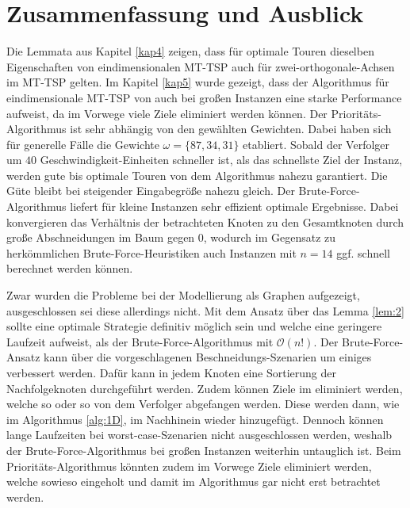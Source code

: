 \documentclass[german,version-2019-11]{uzl-thesis}
\begin{document}
\chapter{Zusammenfassung und Ausblick}
Die Lemmata aus Kapitel \ref{kap4} zeigen, dass für optimale Touren dieselben Eigenschaften von eindimensionalen MT-TSP auch für zwei-orthogonale-Achsen im MT-TSP gelten. Im Kapitel \ref{kap5} wurde gezeigt, dass der Algorithmus für eindimensionale MT-TSP von \cite{helvig} auch bei großen Instanzen eine starke Performance aufweist, da im Vorwege viele Ziele eliminiert werden können. 
Der Prioritäts-Algorithmus ist sehr abhängig von den gewählten Gewichten. Dabei haben sich für generelle Fälle die Gewichte $\omega=\{87,34,31\}$ etabliert. Sobald der Verfolger um $40$ Geschwindigkeit-Einheiten schneller ist, als das schnellste Ziel der Instanz, werden gute bis optimale Touren von dem Algorithmus nahezu garantiert. Die Güte bleibt bei steigender Eingabegröße nahezu gleich. Der Brute-Force-Algorithmus liefert für kleine Instanzen sehr effizient optimale Ergebnisse. Dabei konvergieren das Verhältnis der betrachteten Knoten zu den Gesamtknoten durch große Abschneidungen im Baum gegen $0$, wodurch im Gegensatz zu herkömmlichen Brute-Force-Heuristiken auch Instanzen mit $n=14$ ggf. schnell berechnet werden können. 

Zwar wurden die Probleme bei der Modellierung als Graphen aufgezeigt, ausgeschlossen sei diese allerdings nicht. Mit dem Ansatz über das Lemma \ref{lem:2} sollte eine optimale Strategie definitiv möglich sein und welche eine geringere Laufzeit aufweist, als der Brute-Force-Algorithmus mit $\mathcal{O}(n!)$. Der Brute-Force-Ansatz kann über die vorgeschlagenen Beschneidungs-Szenarien um einiges verbessert werden. Dafür kann in jedem Knoten eine Sortierung der Nachfolgeknoten durchgeführt werden. Zudem können Ziele im eliminiert werden, welche so oder so von dem Verfolger abgefangen werden. Diese werden dann, wie im  Algorithmus \ref{alg:1D}, im Nachhinein wieder hinzugefügt. Dennoch können lange Laufzeiten bei worst-case-Szenarien nicht ausgeschlossen werden, weshalb der Brute-Force-Algorithmus bei großen Instanzen weiterhin  untauglich ist. Beim Prioritäts-Algorithmus könnten zudem im Vorwege Ziele eliminiert werden, welche sowieso eingeholt und damit im Algorithmus gar nicht erst betrachtet werden. 
\end{document}
